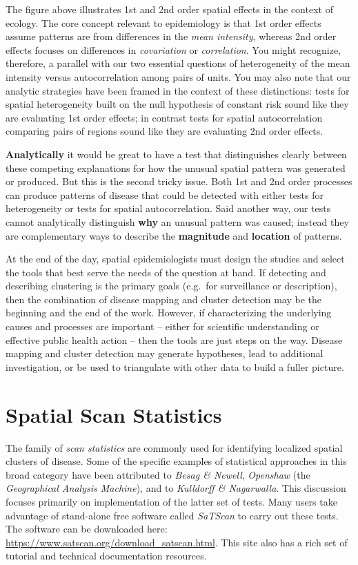 \documentclass[
]{book}
\begin{document}
The figure above illustrates 1st and 2nd order spatial effects in the context of ecology. The core concept relevant to epidemiology is that 1st order effects assume patterns are from differences in the \emph{mean intensity}, whereas 2nd order effects focuses on differences in \emph{covariation} or \emph{correlation}. You might recognize, therefore, a parallel with our two essential questions of heterogeneity of the mean intensity versus autocorrelation among pairs of units. You may also note that our analytic strategies have been framed in the context of these distinctions: tests for spatial heterogeneity built on the null hypothesis of constant risk sound like they are evaluating 1st order effects; in contrast tests for spatial autocorrelation comparing pairs of regions sound like they are evaluating 2nd order effects.

\textbf{Analytically} it would be great to have a test that distinguishes clearly between these competing explanations for how the unusual spatial pattern was generated or produced. But this is the second tricky issue. Both 1st and 2nd order processes can produce patterns of disease that could be detected with either tests for heterogeneity or tests for spatial autocorrelation. Said another way, our tests cannot analytically distinguish \textbf{why} an unusual pattern was caused; instead they are complementary ways to describe the \textbf{magnitude} and \textbf{location} of patterns.

At the end of the day, spatial epidemiologists must design the studies and select the tools that best serve the needs of the question at hand. If detecting and describing clustering is the primary goals (e.g.~for surveillance or description), then the combination of disease mapping and cluster detection may be the beginning and the end of the work. However, if characterizing the underlying causes and processes are important -- either for scientific understanding or effective public health action -- then the tools are just steps on the way. Disease mapping and cluster detection may generate hypotheses, lead to additional investigation, or be used to triangulate with other data to build a fuller picture.

\hypertarget{spatial-scan-statistics}{%
\section{Spatial Scan Statistics}\label{spatial-scan-statistics}}

The family of \emph{scan statistics} are commonly used for identifying localized spatial clusters of disease. Some of the specific examples of statistical approaches in this broad category have been attributed to \emph{Besag \& Newell}, \emph{Openshaw} (the \emph{Geographical Analysis Machine}), and to \emph{Kulldorff \& Nagarwalla}. This discussion focuses primarily on implementation of the latter set of tests. Many users take advantage of stand-alone free software called \emph{SaTScan} to carry out these tests. The software can be downloaded here: \url{https://www.satscan.org/download_satscan.html}. This site also has a rich set of tutorial and technical documentation resources.
\end{document}
